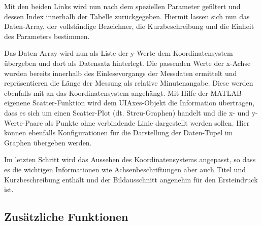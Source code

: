 

Mit den beiden Links wird nun nach dem speziellen Parameter gefiltert und dessen Index innerhalb der Tabelle zurückgegeben. Hiermit lassen sich nun das Daten-Array, der vollständige Bezeichner, die Kurzbeschreibung und die Einheit des Parameters bestimmen. 



Das Daten-Array wird nun als Liste der y-Werte dem Koordinatensystem übergeben und dort als Datensatz hinterlegt. Die passenden Werte der x-Achse wurden bereits innerhalb des Einlesevorgangs der Messdaten ermittelt und repräsentieren die Länge der Messung als relative Minutenangabe. Diese werden ebenfalls mit an das Koordinatensystem angehängt. Mit Hilfe der MATLAB-eigenene Scatter-Funktion wird dem UIAxes-Objekt die Information übertragen, dass es sich um einen Scatter-Plot (dt. Streu-Graphen) handelt und die x- und y-Werte-Paare als Punkte ohne verbindende Linie dargestellt werden sollen. Hier können ebenfalls Konfigurationen für die Darstellung der Daten-Tupel im Graphen übergeben werden.



Im letzten Schritt wird das Aussehen des Koordinatensystems angepasst, so dass es die wichtigen Informationen wie Achsenbeschriftungen aber auch Titel und Kurzbeschreibung enthält und der Bildausschnitt angenehm für den Ersteindruck ist.

\subsection{Zusätzliche Funktionen}


